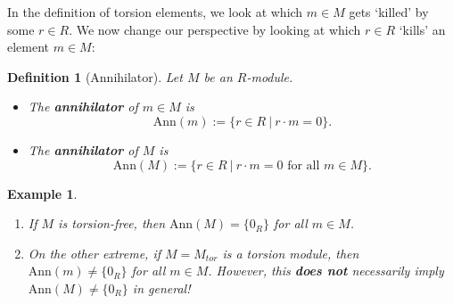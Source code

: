 \documentclass[12pt]{amsbook}
\newtheorem{definition}[theorem]{Definition}
\newtheorem{example}[theorem]{Example}
\begin{document}
In the definition of torsion elements, we look at which $m \in M$ gets `killed' by some $r \in R$. We now change our perspective by looking at which $r \in R$ `kills' an element $m \in M$:
\begin{definition}[Annihilator]
    Let $M$ be an $R$-module.
    \begin{itemize}
        \item The {\bf annihilator} of $m\in M$ is 
        $$\mathrm{Ann}(m):=\{r\in R\ |\ r\cdot m=0\}.$$
        \item The {\bf annihilator} of $M$ is 
        $$\mathrm{Ann}(M):=\{r\in R\ |\ r\cdot m=0\text{ for all }m\in M\}.$$
    \end{itemize}
\end{definition}

\begin{example}
    \begin{enumerate}
        \item If $M$ is torsion-free, then $\mathrm{Ann}(M)=\{0_{R}\}$ for all $m\in M$.
        \item On the other extreme, if $M = M_{tor}$ is a torsion module, then
        $\mathrm{Ann}(m) \neq \{0_R\}$ for all $m \in M$. However, this {\bf does not} necessarily imply $\mathrm{Ann}(M) \neq \{0_R\}$ in general!
\end{enumerate}
\end{example}
\end{document}
